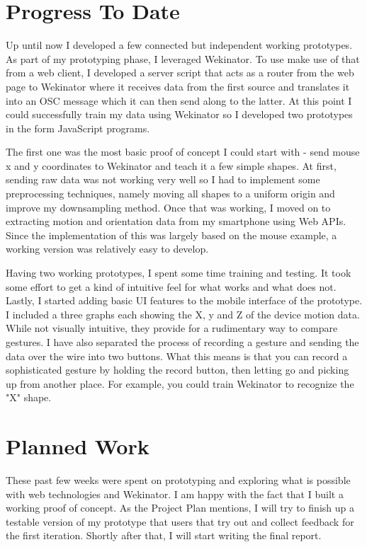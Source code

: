 \documentclass[a4paper, 11pt]{article}
\begin{document}
  \section{Progress To Date}
  Up until now I developed a few connected but independent working prototypes. As part of my prototyping phase, I leveraged Wekinator. To use make use of that from a web client, I developed a server script that acts as a router from the web page to Wekinator where it receives data from the first source and translates it into an OSC message which it can then send along to the latter. At this point I could successfully train my data using Wekinator so I developed two prototypes in the form JavaScript programs.

  The first one was the most basic proof of concept I could start with - send mouse x and y coordinates to Wekinator and teach it a few simple shapes. At first, sending raw data was not working very well so I had to implement some preprocessing techniques, namely moving all shapes to a uniform origin and improve my downsampling method. Once that was working, I moved on to extracting motion and orientation data from my smartphone using Web APIs. Since the implementation of this was largely based on the mouse example, a working version was relatively easy to develop.

  Having two working prototypes, I spent some time training and testing. It took some effort to get a kind of intuitive feel for what works and what does not. Lastly, I started adding basic UI features to the mobile interface of the prototype. I included a three graphs each showing the X, y and Z of the device motion data. While not visually intuitive, they provide for a rudimentary way to compare gestures. I have also separated the process of recording a gesture and sending the data over the wire into two buttons. What this means is that you can record a sophisticated gesture by holding the record button, then letting go and picking up from another place. For example,  you could train Wekinator to recognize the "X" shape.

  \section{Planned Work}
  These past few weeks were spent on prototyping and exploring what is possible with web technologies and Wekinator. I am happy with the fact that I built a working proof of concept. As the Project Plan mentions, I will try to finish up a testable version of my prototype that users that try out and collect feedback for the first iteration. Shortly after that, I will start writing the final report.
\end{document}
